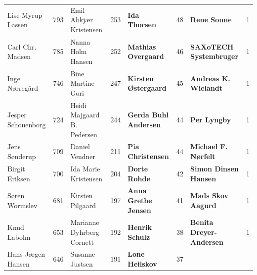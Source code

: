 \begin{table}[h]
\begin{tabular}{l|c|l|c|l|c|l|c}
		Lise Myrup Lassen & 793 & Emil Abkjær Kristensen & 253 & \textbf{Ida Thorsen} & 48 & \textbf{Rene Sonne} & 1 \\
		Carl Chr. Madsen & 785 & Nanna Holm Hansen & 252 & \textbf{Mathias Overgaard} & 46 & \textbf{SAXoTECH Systembruger} & 1 \\
		Inge Nørregård & 746 & Bine Martine Gori & 247 & \textbf{Kirsten Østergaard} & 45 & \textbf{Andreas K. Wielandt} & 1 \\
		Jesper Schouenborg & 724 & Heidi Majgaard B. Pedersen & 244 & \textbf{Gerda Buhl Andersen} & 44 & \textbf{Per Lyngby} & 1 \\
		Jens Sønderup & 709 & Daniel Vendner & 211 & \textbf{Pia Christensen} & 44 & \textbf{Michael F. Nørfelt} & 1 \\
		Birgit Eriksen & 700 & Ida Marie Kristensen & 204 & \textbf{Dorte Rohde} & 42 & \textbf{Simon Dinsen Hansen} & 1 \\
		Søren Wormslev & 681 & Kirsten Pilgaard & 197 & \textbf{Anna Grethe Jensen} & 41 & \textbf{Mads Skov Aagurd} & 1 \\
		Knud Labohn & 653 & Marianne Dyhrberg Cornett & 192 & \textbf{Henrik Schulz} & 38 & \textbf{Benita Dreyer-Andersen} & 1 \\
		Hans Jørgen Hansen & 646 & Susanne Justsen & 191 & \textbf{Lone Heilskov} & 37 & & \\
		\bottomrule
	\end{tabular}
\end{table}
